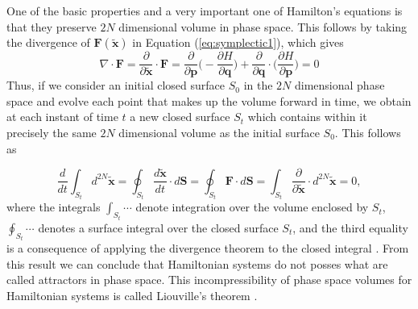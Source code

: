 One of the basic properties and a very important one of Hamilton's equations is that they preserve $2N$ dimensional volume in phase space. This follows by taking the divergence of $\bm{F}(\tilde{\bm{x}})$ in Equation (\ref{eq:symplectic1}), which gives
\begin{equation}
\nabla \cdot \bm{F}=\frac{\partial}{\partial \tilde{\bm{x}}}\cdot \bm{F}=\frac{\partial}{\partial \bm{p}}\Bigg(-\frac{\partial H}{\partial \bm{q}}\Bigg)+\frac{\partial}{\partial \bm{q}}\cdot \Bigg(\frac{\partial H}{\partial \bm{p}}\Bigg)=0
\end{equation}
Thus, if we consider an initial closed surface $S_0$ in the $2N$ dimensional phase space and evolve each point that makes up the volume forward in time, we obtain at each instant of time $t$ a new closed surface $S_t$ which contains within it precisely the same $2N$ dimensional volume as the initial surface $S_0$. This follows as

\begin{equation}
\frac{d}{dt}\int_{S_t}d^{2N}\tilde{\bm{x}}= \oint_{S_t}\frac{d\tilde{\bm{x}}}{dt}\cdot d\bm{S}=\oint_{S_t}\bm{F}\cdot d\bm{S}=\int_{S_t}\frac{\partial }{\partial \tilde{\bm{x}}}\cdot d^{2N}\tilde{\bm{x}}=0,
\end{equation}
where the integrals $\int_{S_t} \cdots$ denote integration over the volume enclosed by $S_t$, $ \oint_{S_t}\cdots$ denotes a surface integral over the closed surface $S_t$, and the third equality is a consequence of applying the divergence theorem to the closed integral \cite{ott_chaos_2002}. From this result we can conclude that Hamiltonian systems do not posses what are called attractors in phase space. This incompressibility of phase space volumes for Hamiltonian systems is called Liouville's theorem \cite{ott_chaos_2002} \cite{goldstein2002classical}.\par

